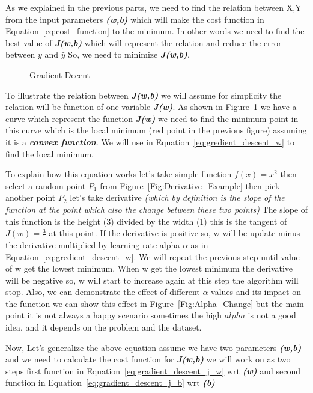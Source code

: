As we explained in the previous parts, we need to find the relation between X,Y from the input parameters \textbf{\textit{(w,b)}} which will make the cost function in Equation~\eqref{eq:cost_function} to the minimum. In other words we need to find the best value of \textbf{\textit{J(w,b)}} which will represent the relation and reduce the error between $y$ and $\widehat{y}$  So, we need to minimize \textbf{\textit{J(w,b)}}.%
\begin{figure}[t]
\begin{center}

\caption{Gradient Decent }\label{Fig:gradient_decent_surf}
\end{center}
\end{figure} 
To illustrate the relation between \textbf{\textit{J(w,b)}} we will assume for simplicity the relation will be function of one variable \textbf{\textit{J(w)}}. As shown in Figure~\ref{Fig:gradient_decent_surf} we have a curve which represent the function \textbf{\textit{J(w)}} we need to find the minimum point in this curve which is the local minimum (red point in the previous figure) assuming it is a  \textbf{\textit{convex function}}. We will use in Equation~\eqref{eq:gredient_descent_w} to find the local minimum.

To explain how this equation works let's take simple function $f(x) = x^2$ then select a random point $P_1$ from Figure~\ref{Fig:Derivative_Example} then pick another point $P_2$ let's take derivative \textit{(which by definition is the slope of the function at the point which also the change between these two points)} The slope of this function is the height (3) divided by the width (1) this is the tangent of $J(w)=\frac{3}{1}$ at this point. If the derivative is positive so, w will be update minus the derivative multiplied by learning rate alpha $\alpha$ as in Equation~\eqref{eq:gredient_descent_w}. We will repeat the previous step until value of w get the lowest minimum. When w get the lowest minimum the derivative will be negative so, w will start to increase again at this step the algorithm will stop. Also, we can demonstrate the effect of different $\alpha$ values and its impact on the function we can show this effect in Figure~\ref{Fig:Alpha_Change} but the main point it is not always a happy scenario sometimes the high $alpha$ is not a good idea, and it depends on the problem and the dataset.

Now, Let's generalize the above equation assume we have two parameters  \textbf{\textit{(w,b)}} and we need to calculate the cost function for  \textbf{\textit{J(w,b)}} we will work on as two steps first function in Equation~\eqref{eq:gradient_descent_j_w}  wrt \textbf{\textit{(w)}} and second function in Equation~\eqref{eq:gradient_descent_j_b} wrt \textbf{\textit{(b)}}

